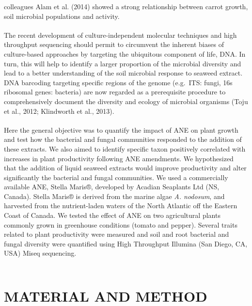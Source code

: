 \documentclass[12pt,]{article}
\begin{document}
colleagues Alam et al. (2014) showed a strong relationship between
carrot growth, soil microbial populations and activity.\\
\hspace*{0.333em}\\
The recent development of culture-independent molecular techniques and
high throughput sequencing should permit to circumvent the inherent
biases of culture-based approaches by targeting the ubiquitous component
of life, DNA. In turn, this will help to identify a larger proportion of
the microbial diversity and lead to a better understanding of the soil
microbial response to seaweed extract. DNA barcoding targeting specific
regions of the genome (e.g.~ITS: fungi, 16s ribosomal genes: bacteria)
are now regarded as a prerequisite procedure to comprehensively document
the diversity and ecology of microbial organisms (Toju et al., 2012;
Klindworth et al., 2013).\\
\hspace*{0.333em}\\
Here the general objective was to quantify the impact of ANE on plant
growth and test how the bacterial and fungal communities responded to
the addition of these extracts. We also aimed to identify specific taxon
positively correlated with increases in plant productivity following ANE
amendments. We hypothesized that the addition of liquid seaweed extracts
would improve productivity and alter significantly the bacterial and
fungal communities. We used a commercially available ANE, Stella Maris®,
developed by Acadian Seaplants Ltd (NS, Canada). Stella Maris® is
derived from the marine algae \emph{A. nodosum}, and harvested from the
nutrient-laden waters of the North Atlantic off the Eastern Coast of
Canada. We tested the effect of ANE on two agricultural plants commonly
grown in greenhouse conditions (tomato and pepper). Several traits
related to plant productivity were measured and soil and root bacterial
and fungal diversity were quantified using High Throughput Illumina (San
Diego, CA, USA) Miseq sequencing.\\
\hspace*{0.333em}\\
\newpage  

\section{MATERIAL AND METHOD}\label{material-and-method}
\end{document}
